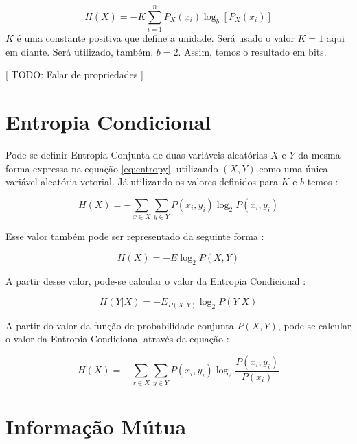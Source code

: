 \begin{equation}
    H(X) = - K \sum_{i=1}^{n} P_X(x_i) \log_b{[P_X(x_i)]}
\label{eq:entropy}
\end{equation}
$K$ é uma constante positiva que define a unidade. Será usado o valor $K=1$ aqui em diante. Será utilizado, também, $b=2$. Assim, temos o resultado em bits.

[ TODO: Falar de propriedades ]

\section{Entropia Condicional}

Pode-se definir Entropia Conjunta de duas variáveis aleatórias $X$ e $Y$ da mesma forma expressa na equação \ref{eq:entropy}, utilizando $(X, Y)$ como uma única variável aleatória vetorial. Já utilizando os valores definidos para $K$ e $b$ temos \cite{livro}:

\begin{equation}
    H(X) = - \sum_{x \in X}\sum_{y \in Y} P(x_i, y_i) \log_2{P(x_i, y_i)}
\label{eq:joint_entropy}
\end{equation}

Esse valor também pode ser representado da seguinte forma \cite{livro}:

\begin{equation}
    H(X) = - E \log_2{P(X, Y)}
\end{equation}

A partir desse valor, pode-se calcular o valor da Entropia Condicional \cite{livro}:

\begin{equation}
    H(Y|X) = - E_{P(X,Y)} \log_2{P(Y|X)}
\end{equation}

A partir do valor da função de probabilidade conjunta $P(X,Y)$, pode-se calcular o valor da Entropia Condicional através da equação \cite{livro}:

\begin{equation}
    H(X) = - \sum_{x \in X}\sum_{y \in Y} P(x_i, y_i) \log_2{\frac{P(x_i, y_i)}{P(x_i)}}
\end{equation}





\section{Informação Mútua}

